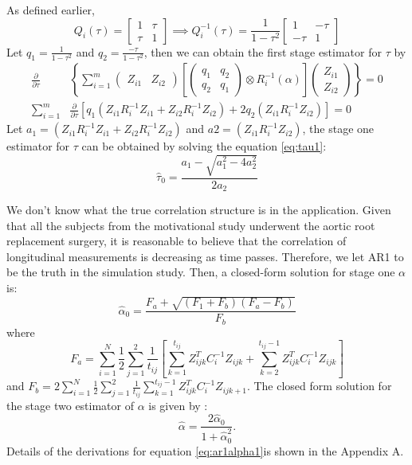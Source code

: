 \documentclass[
]{aft}
\begin{document}
As defined earlier, \[
Q_i(\tau) = 
\begin{bmatrix}
1 & \tau\\
\tau & 1
\end{bmatrix}
\implies 
Q_i^{-1}(\tau) = \frac{1}{1-\tau^2}
\begin{bmatrix}
1 & -\tau\\
-\tau & 1
\end{bmatrix}
\] Let \(q_1 = \frac{1}{1-\tau^2}\) and
\(q_2 = \frac{-\tau}{1-\tau^2}\), then we can obtain the first stage
estimator for \(\tau\) by \begin{align}
\frac{\partial}{\partial \tau}& \left\{
\sum_{i=1}^m 
\begin{pmatrix}
Z_{i1} & Z_{i2}
\end{pmatrix} 
\left[\begin{pmatrix}
q_1 & q_2\\
q_2 & q_1
\end{pmatrix} 
\otimes R_i^{-1}(\alpha)\right] 
\begin{pmatrix}
Z_{i1}\\ Z_{i2}
\end{pmatrix} \right\} = 0 \\
\sum_{i=1}^m &  \frac{\partial}{\partial \tau}\left[q_1(Z_{i1}R_i^{-1}Z_{i1}+Z_{i2}R_i^{-1}Z_{i2}) + 2q_2(Z_{i1}R_i^{-1}Z_{i2})\right]= 0 \label{eq:tau1}
\end{align} Let \(a_1 = (Z_{i1}R_i^{-1}Z_{i1}+Z_{i2}R_i^{-1}Z_{i2})\)
and \(a2 = (Z_{i1}R_i^{-1}Z_{i2})\), the stage one estimator for
\(\tau\) can be obtained by solving the equation \eqref{eq:tau1}: \[
\hat{\tau}_0 = \frac{a_1 - \sqrt{a_1^2 - 4a_2^2}}{2a_2}
\]

We don't know what the true correlation structure is in the application.
Given that all the subjects from the motivational study underwent the
aortic root replacement surgery, it is reasonable to believe that the
correlation of longitudinal measurements is decreasing as time passes.
Therefore, we let AR1 to be the truth in the simulation study. Then, a
closed-form solution for stage one \(\alpha\) is: \begin{equation}
\hat{\alpha}_0 = \frac{F_a + \sqrt{(F_1+F_b)(F_a-F_b)}}{F_b} \label{eq:ar1alpha1}
\end{equation} where \[
F_a = \sum_{i=1}^N \frac{1}{2} \sum_{j=1}^2 \frac{1}{t_{ij}}\left[\sum_{k=1}^{t_{ij}} Z_{ijk}^T C_i^{-1} Z_{ijk} + \sum_{k=2}^{t_{ij}-1}Z_{ijk}^T C_i^{-1} Z_{ijk}\right]
\] and
\(F_b = 2\sum_{i=1}^N \frac{1}{2}\sum_{j=1}^2\frac{1}{t_{ij}}\sum_{k=1}^{t_{ij}-1} Z_{ijk}^T C_i^{-1} Z_{ijk+1}\).
The closed form solution for the stage two estimator of \(\alpha\) is
given by \citep{Mitani2019}: \begin{equation}
\hat{\alpha} = \frac{2\hat{\alpha}_0}{1+\hat{\alpha}_0^2}. \label{eq:ar1alpha2}
\end{equation} Details of the derivations for equation
\eqref{eq:ar1alpha1}is shown in the Appendix A.
\end{document}
